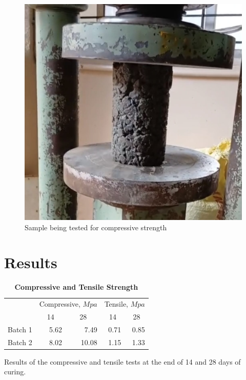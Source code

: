 \documentclass{ieeeaccess}
\begin{document}
\begin{figure}[h]
    \caption{Sample being tested for compressive strength}
    \centering
    \includegraphics[scale=0.15]{compressive}
\end{figure}


\section{Results}

\begin{table}[htb]
    \begin{threeparttable}
        \caption{\textbf{Compressive and Tensile Strength}}
        \label{table:str-test}
        \setlength{\tabcolsep}{16.5pt}
        \def\arraystretch{1.5}%
        \begin{tabular}{ l r r r r }
            \hline
            & \multicolumn{2}{c}{Compressive, $Mpa$} & 
                \multicolumn{2}{c}{Tensile, $Mpa$} \\

            \cline{2-5}
            & \multicolumn{1}{c}{14} & \multicolumn{1}{c}{28} & 
                \multicolumn{1}{c}{14} & \multicolumn{1}{c}{28} \\

            \hline

            Batch 1 & 5.62 & 7.49  & 0.71 & 0.85 \\
            Batch 2 & 8.02 & 10.08 & 1.15 & 1.33 \\

            \hline
        \end{tabular} 
        \begin{tablenotes}
            \item Results of the compressive and tensile tests at the end of 
            14 and 28 days of curing.
        \end{tablenotes}
    \end{threeparttable}
\end{table}
\end{document}
